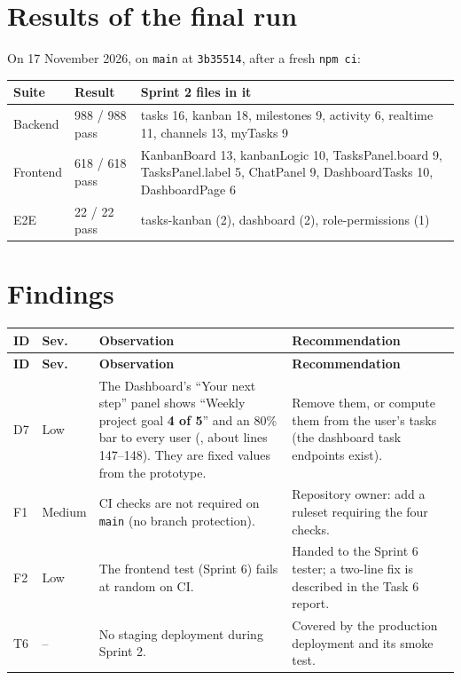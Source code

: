 \documentclass[11pt,a4paper]{article}
\begin{document}
\section{Results of the final run}
On 17 November 2026, on \texttt{main} at \texttt{3b35514}, after a fresh \texttt{npm ci}:
\begin{center}
\begin{tabularx}{\linewidth}{l l X}\toprule
\textbf{Suite} & \textbf{Result} & \textbf{Sprint 2 files in it}\\\midrule
Backend & 988 / 988 pass & tasks 16, kanban 18, milestones 9, activity 6, realtime 11, channels 13, myTasks 9 \\
Frontend & 618 / 618 pass & KanbanBoard 13, kanbanLogic 10, TasksPanel.board 9, TasksPanel.label 5, ChatPanel 9, DashboardTasks 10, DashboardPage 6 \\
E2E & 22 / 22 pass & tasks-kanban (2), dashboard (2), role-permissions (1) \\
\bottomrule\end{tabularx}\end{center}

\section{Findings}
{\small{}
\begin{xltabular}{\linewidth}{l l X X}\toprule
\textbf{ID} & \textbf{Sev.} & \textbf{Observation} & \textbf{Recommendation}\\\midrule\endfirsthead
\toprule\textbf{ID} & \textbf{Sev.} & \textbf{Observation} & \textbf{Recommendation}\\\midrule\endhead
D7 & Low & The Dashboard's ``Your next step'' panel shows ``Weekly project goal \textbf{4 of 5}'' and an 80\% bar to every user
(, about lines 147--148). They are fixed values from the prototype. & Remove them, or compute them from the user's tasks (the dashboard task endpoints exist). \\
F1 & Medium & CI checks are not required on \texttt{main} (no branch protection). & Repository owner: add a ruleset requiring the four checks. \\
F2 & Low & The frontend test  (Sprint 6) fails at random on CI. & Handed to the Sprint 6 tester; a two-line fix is described in the Task 6 report. \\
T6 & -- & No staging deployment during Sprint 2. & Covered by the production deployment and its smoke test. \\
\bottomrule\end{xltabular}}
\end{document}
